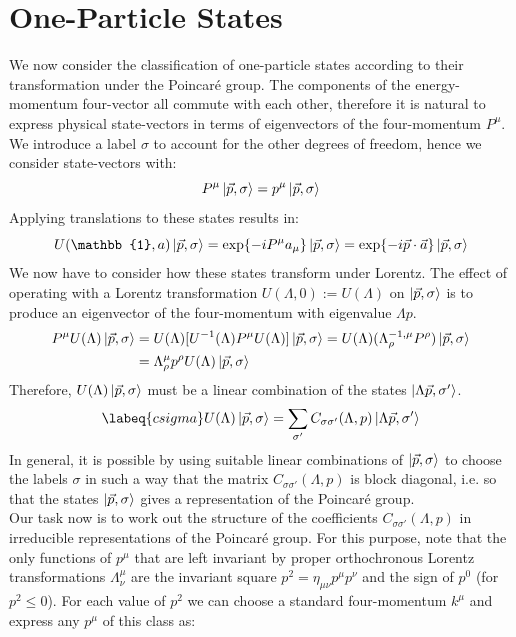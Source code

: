 \documentclass[../main.tex]{subfiles}
\begin{document}
\section{One-Particle States}
We now consider the classification of one-particle states according to their transformation under the Poincaré group. The components of the energy-momentum four-vector all commute with each other, therefore it is natural to express physical state-vectors in terms of eigenvectors of the four-momentum $P^\mu$. We introduce a label $\sigma$ to account for the other degrees of freedom, hence we consider state-vectors with:
\[
P^\mu\ket{\vec{p},\sigma}=p^\mu\ket{\vec{p},\sigma}
\]
Applying translations to these states results in:
\[
U(\mathbb{1},a)\ket{\vec{p},\sigma}=\exp{-iP^\mu a_\mu}\ket{\vec{p},\sigma}=\exp{-i\Vec{p}\cdot \vec{a}}\ket{\vec{p},\sigma}
\]
We now have to consider how these states transform under Lorentz. The effect of operating with a Lorentz transformation $U(\Lambda,0):=U(\Lambda)$ on $\ket{\vec{p},\sigma}$ is to produce an eigenvector of the four-momentum with eigenvalue $\Lambda p$.
\begin{align*}
P^\mu U(\Lambda)\ket{\vec{p},\sigma}&=U(\Lambda)[U^{-1}(\Lambda)P^\mu U(\Lambda)]\ket{\vec{p},\sigma}=U(\Lambda)(\Lambda^{-1,\mu}_\rho P^\rho)\ket{\vec{p},\sigma}\\
&=\Lambda^\mu_\rho p^\rho U(\Lambda)\ket{\vec{p},\sigma}
\end{align*}
Therefore, $U(\Lambda)\ket{\vec{p},\sigma}$ must be a linear combination of the states $\ket{\Lambda \Vec{p},\sigma'}$.
\begin{equation}
\labeq{csigma}
U(\Lambda)\ket{\vec{p},\sigma}=\sum_{\sigma'}C_{\sigma\sigma'}(\Lambda,p)\ket{\Lambda \Vec{p},\sigma'}
\end{equation}
In general, it is possible by using suitable linear combinations of $\ket{\vec{p},\sigma}$ to choose the labels $\sigma$ in such a way that the matrix $C_{\sigma\sigma'}(\Lambda,p)$ is block diagonal, i.e. so that the states $\ket{\vec{p},\sigma}$ gives a representation of the Poincaré group.\\
Our task now is to work out the structure of the coefficients $C_{\sigma\sigma'}(\Lambda,p)$ in irreducible representations of the Poincaré group. For this purpose, note that the only functions of $p^\mu$ that are left invariant by proper orthochronous Lorentz transformations $\Lambda^\mu_\nu$ are the invariant square $p^2=\eta_{\mu\nu}p^\mu p^\nu$ and the sign of $p^0$ (for $p^2\le0$). For each value of $p^2$ we can choose a standard four-momentum $k^\mu$ and express any $p^\mu$ of this class as:
\end{document}
